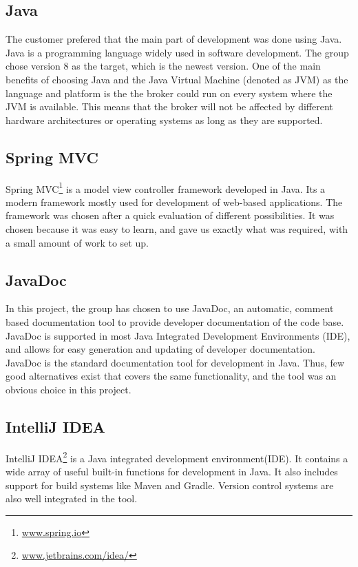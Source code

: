\subsection{Java}

The customer prefered that the main part of development was done using Java. Java is a programming language widely used in software development. The group chose version 8 as the target, which is the newest version. One of the main benefits of choosing Java and the Java Virtual Machine (denoted as JVM) as the language and platform is the the broker could run on every system where the JVM is available. This means that the broker will not be affected by different hardware architectures or operating systems as long as they are supported.

\subsection{Spring MVC}

Spring MVC\footnote{\url{www.spring.io}} is a model view controller framework developed in Java. Its a modern framework mostly used for development of web-based applications. The framework was chosen after a quick evaluation of different possibilities. It was chosen because it was easy to learn, and gave us exactly what was required, with a small amount of work to set up.

\subsection{JavaDoc}

In this project, the group has chosen to use JavaDoc, an automatic, comment based documentation tool to provide developer documentation of the code base. JavaDoc is supported in most Java Integrated Development Environments (IDE), and allows for easy generation and updating of developer documentation. JavaDoc is the standard documentation tool for development in Java. Thus, few good alternatives exist that covers the same functionality, and the tool was an obvious choice in this project.

\subsection{IntelliJ IDEA}

IntelliJ IDEA\footnote{\url{www.jetbrains.com/idea/}} is a Java integrated development environment(IDE). It contains a wide array of useful built-in functions for development in Java. It also includes support for build systems like Maven and Gradle. Version control systems are also well integrated in the tool.

